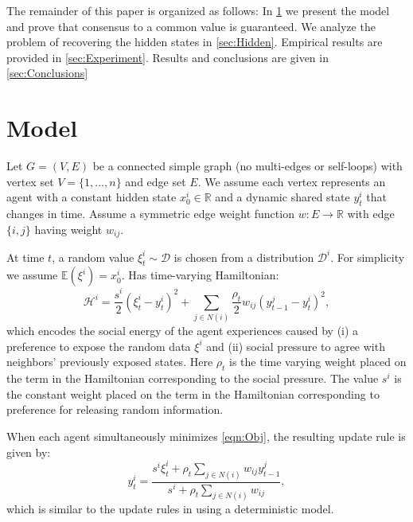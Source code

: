 \documentclass[aps,superscriptaddress,floatfix,amsmath,amssymb]{revtex4-2}
\begin{document}
The remainder of this paper is organized as follows: In \cref{sec:Model} we present the model and prove that consensus to a common value is guaranteed. We analyze the problem of recovering the hidden states in \cref{sec:Hidden}. Empirical results are provided in \cref{sec:Experiment}. Results and conclusions are given in \cref{sec:Conclusions}

\section{Model}\label{sec:Model}
Let $G = (V,E)$ be a connected simple graph (no multi-edges or self-loops) with vertex set $V = \{1,\dots,n\}$ and edge set $E$. We assume each vertex represents an agent with a constant hidden state  $x^i_0 \in \mathbb{R}$ and a dynamic shared state $y^i_t$ that changes in time. Assume a symmetric edge weight function $w:E\to\mathbb{R}$ with edge $\{i,j\}$ having weight $w_{ij}$. 

At time $t$, a random value $\xi^i_t \sim \mathcal{D}$ is chosen from a distribution $\mathcal{D}^i$. For simplicity we assume $\mathbb{E}\left(\xi^i\right) = x_0^i$. Has time-varying Hamiltonian:
\begin{equation}
\mathcal{H}^i = \frac{s^i}{2}\left(\xi^i_t - y_t^i\right)^2 + \sum_{j \in N(i)}\frac{\rho_t}{2}w_{ij}\left(y_{t-1}^j - y_t^i\right)^2,
\label{eqn:Obj}
\end{equation}
which encodes the social energy of the agent experiences caused by (i) a preference to expose the random data $\xi^i$ and (ii) social pressure to agree with neighbors' previously exposed states. Here $\rho_t$ is the time varying weight placed on the term in the Hamiltonian corresponding to the social pressure. The value $s^i$ is the constant weight placed on the term in the Hamiltonian corresponding to preference for releasing random information. 

When each agent simultaneously minimizes \cref{eqn:Obj}, the resulting update rule is given by:
\begin{equation}
y^i_{t} = \frac{s^i\xi_{t}^{i} + \rho_t \sum_{j \in N(i)} w_{ij} y^j_{t-1}}{s^i + \rho_t\sum_{j \in N(i)} w_{ij}},
\label{eqn:DerivedUpdate}
\end{equation}
which is similar to the update rules in \cite{SGSR18,G21,T19,T15,Bindel2015248} using a deterministic model.
\end{document}
